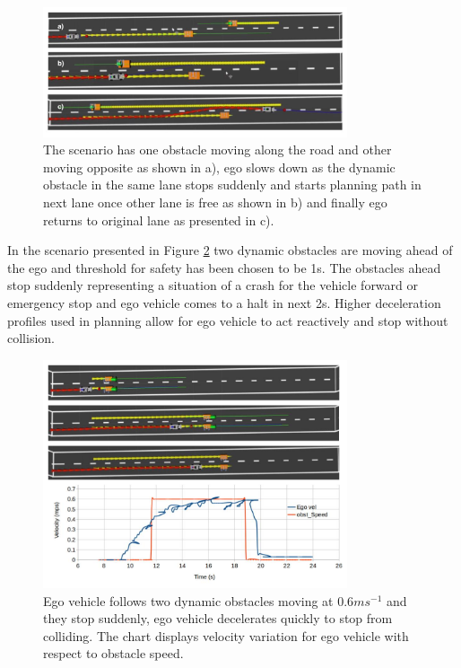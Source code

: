 \fi
\begin{figure}
    \centering
    \includegraphics[width=0.8\textwidth]{Images/evaluation/sudden_Stop_dyn_1.jpg}
    \caption{The scenario has one obstacle moving along the road and other moving opposite as shown in a), ego slows down as the dynamic obstacle in the same lane stops suddenly and starts planning path in next lane once other lane is free as shown in b) and finally ego returns to original lane as presented in c). }
    \label{dynamic_1}
\end{figure}

In the scenario presented in Figure \ref{dynamic_2} two dynamic obstacles are moving ahead of the ego and threshold for safety has been chosen to be 1s. The obstacles ahead stop suddenly representing a situation of a crash for the vehicle forward or emergency stop and ego vehicle comes to a halt in next 2s. Higher deceleration profiles used in planning allow for ego vehicle to act reactively and stop without collision. 

\begin{figure}
	\centering
	\includegraphics[width=0.8\textwidth]{Images/evaluation/sudden_stopping_lane_blocked_2.jpg}
	\caption{Ego vehicle follows two dynamic obstacles moving at $0.6ms^{-1}$ and they stop suddenly, ego vehicle decelerates quickly to stop from colliding. The chart displays velocity variation for ego vehicle with respect to obstacle speed.}
	\label{dynamic_2}
\end{figure}



